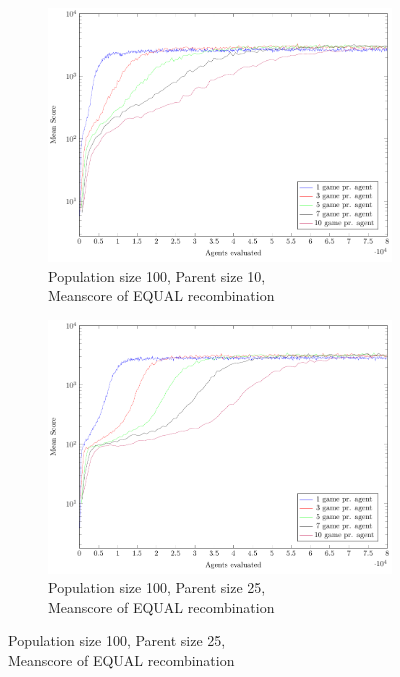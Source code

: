 \begin{figure}
    \centering
    \begin{subfigure}[b]{0.45\textwidth}
    	\centering
        \caption{Population size 100, Parent size 10, \\Meanscore of EQUAL recombination}
        \includegraphics[width=\textwidth]{data/cma_population_offspring/100x_split/equal_l100_o10/mean/PlotFile.pdf}
    \end{subfigure} 
    \begin{subfigure}[b]{0.45\textwidth}
    	\centering
    	\caption{Population size 100, Parent size 25, \\ Meanscore of EQUAL recombination}
        \includegraphics[width=\textwidth]{data/cma_population_offspring/100x_split/equal_l100_o25/mean/PlotFile.pdf}

\end{subfigure}
\end{figure}
